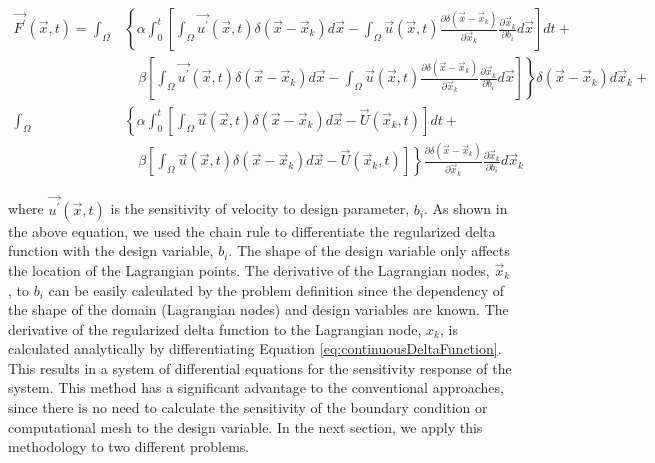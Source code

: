 \documentclass[12pt]{aiaa-pretty}
\begin{document}
%
\begin{equation}
\begin{aligned}\label{eq:forceingFunctionDerivative}
	\vec{F^\prime}(\vec{x}, t) = 
	\int_\Omega 
	&\left\{
 	\alpha \int_0^t
	\left[
	\int_\Omega \vec{u^\prime} (\vec{x}, t) \delta(\vec{x} - \vec{x}_k) d\vec{x} - 
	\int_\Omega \vec{u} (\vec{x}, t) \frac{\partial \delta(\vec{x} - \vec{x}_k)}{\partial \vec{x}_k} \frac{\partial \vec{x}_k}{\partial b_i} d\vec{x}
	\right]dt + \right. \\
	&\left.
	\quad \beta
	\left[
	\int_\Omega \vec{u^\prime} (\vec{x}, t) \delta(\vec{x} - \vec{x}_k) d\vec{x} - 
	\int_\Omega \vec{u} (\vec{x}, t) \frac{\partial \delta(\vec{x} - \vec{x}_k)}{\partial \vec{x}_k} \frac{\partial \vec{x}_k}{\partial b_i} d\vec{x}
	\right]
	\right\} \delta(\vec{x} - \vec{x}_k) d\vec{x}_k + \\
	\int_\Omega 
	&\left\{
 	\alpha \int_0^t
	\left[
	\int_\Omega \vec{u} (\vec{x}, t) \delta(\vec{x} - \vec{x}_k) d\vec{x} - \vec{U}\left( \vec{x}_k, t \right)
	\right]dt + \right. \\
	&\left.
	\quad \beta \left[
	\int_\Omega \vec{u} (\vec{x}, t) \delta(\vec{x} - \vec{x}_k) d\vec{x} - \vec{U}\left( \vec{x}_k, t \right)
	\right]
	\right\} \frac{\partial \delta(\vec{x} - \vec{x}_k)}{\partial \vec{x}_k} \frac{\partial \vec{x}_k}{\partial b_i} d\vec{x}_k
\end{aligned}
\end{equation}
%

where $\vec{u^\prime}\left( \vec{x}, t \right)$ is the sensitivity of velocity to design parameter, $b_i$. As shown in the above equation, we used the chain rule to differentiate the regularized delta function with the design variable, $b_i$. The shape of the design variable only affects the location of the Lagrangian points. The derivative of the Lagrangian nodes, $\vec{x}_k$, to $b_i$ can be easily calculated by the problem definition since the dependency of the shape of the domain (Lagrangian nodes) and design variables are known. The derivative of the regularized delta function to the Lagrangian node, $x_k$, is calculated analytically by differentiating Equation \eqref{eq:continuousDeltaFunction}. This results in a system of differential equations for the sensitivity response of the system. This method has a significant advantage to the conventional approaches, since there is no need to calculate the sensitivity of the boundary condition or computational mesh to the design variable. In the next section, we apply this methodology to two different problems.
\end{document}
